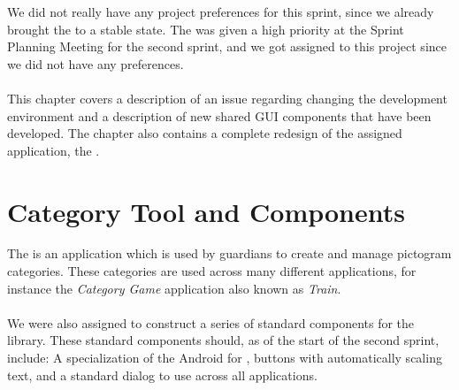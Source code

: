 \FloatBarrier

We did not really have any project preferences for this sprint, since we already brought the \launcher to a stable state. The \giraf \ct was given a high priority at the Sprint Planning Meeting for the second sprint, and we got assigned to this project since we did not have any preferences. 
\\\\
This chapter covers a description of an issue regarding changing the development environment and a description of new shared GUI components that have been developed. The chapter also contains a complete redesign of the assigned application, the \ct.

\section{Category Tool and Components}
\label{sec:category_tool_and_components}

The \giraf \ct is an application which is used by guardians to create and manage pictogram categories. These categories are used across many different applications, for instance the \emph{Category Game} application also known as \emph{Train}.
\\\\
We were also assigned to construct a series of standard components for the \gc library. These standard components should, as of the start of the second sprint, include: A specialization of the Android  for \giraf, buttons with automatically scaling text, and a standard dialog to use across all applications.





